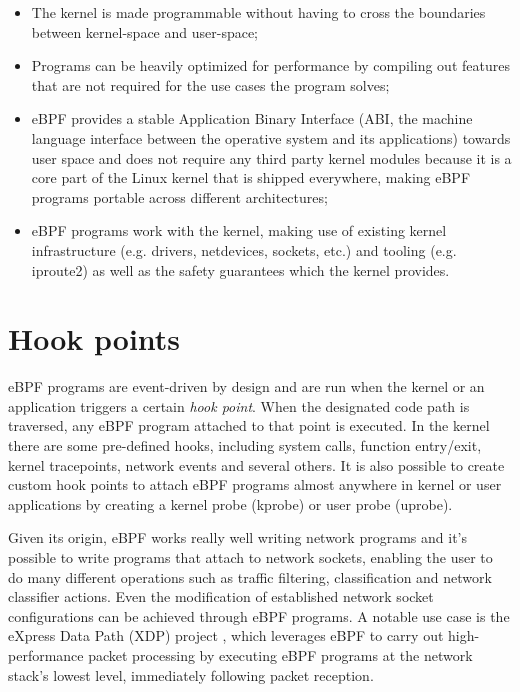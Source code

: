 \begin{itemize}
	\item 
		The kernel is made programmable without having to cross the boundaries between kernel-space and user-space;
	\item 
		Programs can be heavily optimized for performance by compiling out features that are not required for the use cases the program solves;
	\item 
		eBPF provides a stable Application Binary Interface (ABI, the machine language interface between the operative system and its applications) towards user space and does not require any third party kernel modules because it is a core part of the Linux kernel that is shipped everywhere, making eBPF programs portable across different architectures;
	\item 
		eBPF programs work with the kernel, making use of existing kernel infrastructure (e.g. drivers, netdevices, sockets, etc.) and tooling (e.g. iproute2) as well as the safety guarantees which the kernel provides.
\end{itemize}

\section{Hook points}

eBPF programs are event-driven by design and are run when the kernel or an application triggers a certain \textit{hook point}. 
When the designated code path is traversed, any eBPF program attached to that point is executed.
In the kernel there are some pre-defined hooks, including system calls, function entry/exit, kernel tracepoints, network events and several others.
It is also possible to create custom hook points to attach eBPF programs almost anywhere in kernel or user applications by creating a kernel probe (kprobe) or user probe (uprobe).

Given its origin, eBPF works really well writing network programs and it's possible to write programs that attach to network sockets, enabling the user to do many different operations such as traffic filtering, classification and network classifier actions.
Even the modification of established network socket configurations can be achieved through eBPF programs.
A notable use case is the eXpress Data Path (XDP) project \cite{XDPWebsite}, which leverages eBPF to carry out high-performance packet processing by executing eBPF programs at the network stack's lowest level, immediately following packet reception.

